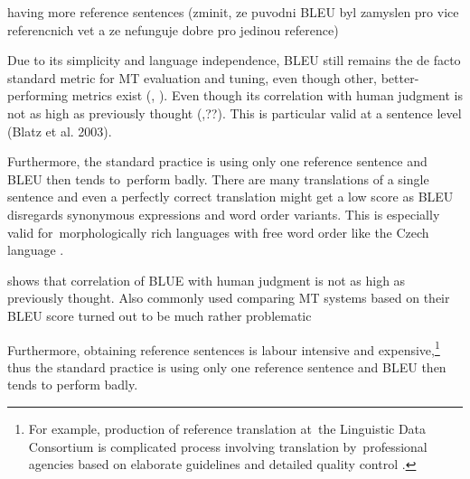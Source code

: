 having more reference sentences (zminit, ze puvodni BLEU byl zamyslen pro vice referencnich vet a ze nefunguje dobre pro jedinou reference)





Due to its simplicity and language independence, BLEU still remains the de facto standard metric for MT evaluation and tuning, even though other, better-performing metrics exist (\cite{wmt13-metrics}, \cite{wmt14}).
Even though its correlation with human judgment is not as high as previously thought (\cite{callison2006re},\cite{koehn-monz:2006:WMT}??). 
This is particular valid at a sentence level (Blatz et al. 2003).

Furthermore, the standard practice is using only one reference sentence and BLEU  then tends to~perform badly. 
There are many translations of a single sentence and even a perfectly correct translation might get a low score as BLEU disregards synonymous expressions and word order variants.
This is especially valid for~morphologically rich languages with free word order like the Czech language \cite{bojar-tackling-sparse-data}.



\cite{callison2006re} shows that correlation of BLUE with human judgment is not as high as previously thought. 
Also commonly used comparing MT systems based on their BLEU score turned out to be much rather problematic \cite{post-2018-call}

Furthermore, obtaining reference sentences is labour intensive and expensive,\footnote{For example, production of reference translation at~the Linguistic Data Consortium is complicated process involving translation by~professional agencies based on elaborate guidelines and detailed quality control \cite{strassel}.} thus the standard practice is using only one reference sentence and BLEU then tends to perform badly. 

